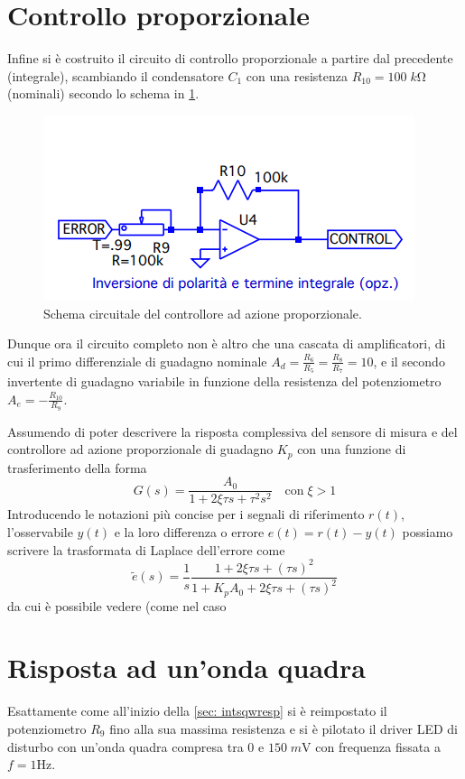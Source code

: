 \documentclass[10pt, a4paper, italian]{article}
\begin{document}
\section*{Controllo proporzionale}
Infine si è costruito il circuito di controllo proporzionale a partire dal
precedente (integrale), scambiando il condensatore $C_1$ con una resistenza
$R_{10} = 100 \; \si{k\ohm}$ (nominali) secondo lo schema in \cref{schm: prop}.
\begin{figure}[htbp]
    \centering
	\includegraphics[scale=0.6]{controlgenprop}
    \caption{Schema circuitale del controllore ad azione proporzionale.
    \label{schm: prop}}
\end{figure}

Dunque ora il circuito completo non è altro che una cascata di
amplificatori, di cui il primo differenziale di guadagno nominale
$A_d = \frac{R_6}{R_5} = \frac{R_8}{R_7} = 10$, e il secondo invertente di
guadagno variabile in funzione della resistenza del potenziometro
$A_e = -\frac{R_{10}}{R_9}$.

Assumendo di poter descrivere la risposta complessiva del sensore di misura e
del controllore ad azione proporzionale di guadagno $K_p$ con una funzione di
trasferimento della forma
\begin{equation}
G(s) = \frac{A_0}{1 + 2\xi \tau s + \tau^2 s^2} \quad \text{con} \; \xi > 1
\end{equation}
Introducendo le notazioni più concise per i segnali di riferimento $r(t)$,
l'osservabile $y(t)$ e la loro differenza o errore $e(t) = r(t) - y(t)$
possiamo scrivere la trasformata di Laplace dell'errore come
\begin{equation}
\tilde{e}(s) = \frac{1}{s} \frac{1 + 2\xi \tau s + (\tau s)^2}
{1 + K_p A_0 + 2 \xi \tau s + (\tau s)^2}
\end{equation}
da cui è possibile vedere (come nel caso
\section{Risposta ad un'onda quadra}
Esattamente come all'inizio della \cref{sec: intsqwresp} si è reimpostato
il potenziometro $R_9$ fino alla sua massima resistenza e si è pilotato il
driver LED di disturbo con un'onda quadra compresa tra $0$ e
$150 \; \si{m\V}$ con frequenza fissata a $f = 1 \si{\Hz}$.
\end{document}
